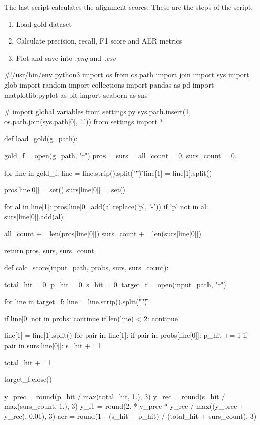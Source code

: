 The last script calculates the alignment scores. These are the steps of the script:

\begin{enumerate}
  \item Load gold dataset
  \item Calculate precision, recall, F1 score and AER metrics
  \item Plot and save into \emph{.png} and \emph{.csv}
\end{enumerate}

\begin{python}
#!/usr/bin/env python3
import os
from os.path import join
import sys
import glob
import random
import collections
import pandas as pd
import matplotlib.pyplot as plt
import seaborn as sns

# import global variables from settings.py
sys.path.insert(1, os.path.join(sys.path[0], '..'))
from settings import *

def load_gold(g_path):

  gold_f = open(g_path, "r")
  pros = {}
  surs = {}
  all_count = 0.
  surs_count = 0.

  for line in gold_f:
    line = line.strip().split("\t")
    line[1] = line[1].split()

    pros[line[0]] = set()
    surs[line[0]] = set()

    for al in line[1]:
      pros[line[0]].add(al.replace('p', '-'))
      if 'p' not in al:
        surs[line[0]].add(al)

    all_count += len(pros[line[0]])
    surs_count += len(surs[line[0]])

  return pros, surs, surs_count


def calc_score(input_path, probs, surs, surs_count):

  total_hit = 0.
  p_hit = 0.
  s_hit = 0.
  target_f = open(input_path, "r")

  for line in target_f:
    line = line.strip().split("\t")

    if line[0] not in probs: continue
    if len(line) < 2: continue

    line[1] = line[1].split()
    for pair in line[1]:
      if pair in probs[line[0]]:
        p_hit += 1
      if pair in surs[line[0]]:
        s_hit += 1

      total_hit += 1

  target_f.close()

  y_prec = round(p_hit / max(total_hit, 1.), 3)
  y_rec = round(s_hit / max(surs_count, 1.), 3)
  y_f1 = round(2. * y_prec * y_rec / max((y_prec + y_rec), 0.01), 3)
  aer = round(1 - (s_hit + p_hit) / (total_hit + surs_count), 3)


\end{python}
